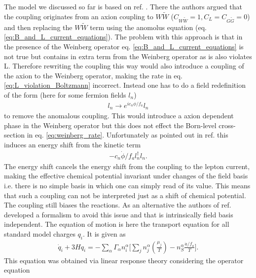 \documentclass[13pt,a4paper,titlepage]{article}
\begin{document}
The model we discussed so far is based on ref. \cite{Axion_leptogenesis_Kusenko_2015}.
There the authors argued that the coupling originates from an axion coupling to $W \tilde{W}$ ($C_{W \tilde{W}} = 1, C_L = C_{G \tilde{G}} = 0$) and then replacing the $W \tilde{W}$ term using
the anomolus equation (eq. \eqref{eq:B_and_L_current_equations}).
The problem with this approach is that in the presence of the Weinberg operator eq. \eqref{eq:B_and_L_current_equations} is not true but contains in extra term from the Weinberg operator as
is also violates L. Therefore rewriting the coupling this way would also introduce a coupling of
the axion to the Weinberg operator, making the rate in eq. \eqref{eq:L_violation_Boltzmann} incorrect.
Instead one has to do a field redefinition of the form (here for some fermion fields $l_n$)
\begin{align}
    l_n \to e^{i c_n \phi / f_a} l_n
\end{align}
to remove the anomalous coupling. This would introduce a axion dependent phase in the Weinberg operator
but this does not effect the Born-level cross-section in eq. \eqref{eq:weinberg_rate}.
Unfortunately as pointed out in ref. \cite{Shi_2015_Basis_Invariance_chemical_equilibrium} this induces an energy shift from the kinetic term \cite[eq. 6]{Shi_2015_Basis_Invariance_chemical_equilibrium}
\begin{align}
    - c_n \dot{\phi} / {f_a} l_n^{\dagger} l_n.
\end{align}
The energy shift cancels the energy shift from the coupling to the lepton current, making the effective
chemical potential invariant under changes of the field basis i.e. there is no simple basis in which
one can simply read of its value.
This means that such a coupling can not be interpreted just as a shift of chemical potential.
The coupling still biases the reactions.
As an alternative the authors of ref. \cite{Domcke:2020kcp_Generic_Couplings} developed a formalism
to avoid this issue and that is intrinsically field basis independent.
The equation of motion is here the transport equation for all standard model charges $q_i$.
It is
given as \cite[eq. 3.4]{Domcke:2020kcp_Generic_Couplings}
\begin{align}
\label{eq:transport_equation}
\dot{q}_i + 3 H q_i = - \sum_\alpha \Gamma_\alpha n^\alpha_i \Big[
\sum_j n^\alpha_j \left( \frac{\mu_j}{T} \right) - n_S^\alpha \frac{\dot{a} / f_a}{T} \Big].
\end{align}
This equation was obtained via linear response theory considering the operator equation \cite[eq. 2.1]{Domcke:2020kcp_Generic_Couplings}
\end{document}
